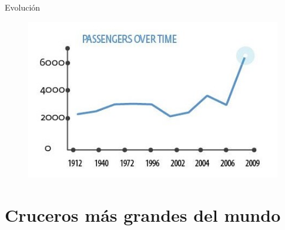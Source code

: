 \documentclass{beamer}
\begin{document}
\begin{frame}{Evolución}

\begin{figure}
\includegraphics[scale=0.5]{pass}
\end{figure}

\end{frame}
\section{Cruceros más grandes del mundo}
\end{document}
